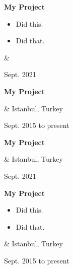 \documentclass[10pt, letterpaper]{article}
\newenvironment{highlights}{
        \begin{itemize}[
                topsep=0pt,
                parsep=0.10 cm,
                partopsep=0pt,
                itemsep=0pt,
                after=\vspace{-1\baselineskip},
                leftmargin=0.4 cm + 3pt
            ]
    }{
        \end{itemize}
    } %
\let\originalTabularx\tabularx
\let\originalEndTabularx\endtabularx
\renewenvironment{tabularx}{\bgroup\centering\originalTabularx}{\originalEndTabularx\par\egroup}
\begin{document}
        \vspace{0.2 cm}
        \begin{tabularx}{
            \textwidth-0.4 cm-0.13cm
        }{
            K{0.2 cm}
            R{4.1 cm}
        }
            \textbf{My Project}

            \vspace{0.10 cm}

            \begin{highlights}
                \item Did this.
                \item Did that.
            \end{highlights}
            &
            

            Sept. 2021
        \end{tabularx}


        \vspace{0.2 cm}
        \begin{tabularx}{
            \textwidth-0.4 cm-0.13cm
        }{
            K{0.2 cm}
            R{4.1 cm}
        }
            \textbf{My Project}

            \vspace{0.10 cm}

            &
            Istanbul, Turkey

            Sept. 2015 to present
        \end{tabularx}


        \vspace{0.2 cm}
        \begin{tabularx}{
            \textwidth-0.4 cm-0.13cm
        }{
            K{0.2 cm}
            R{4.1 cm}
        }
            \textbf{My Project}

            \vspace{0.10 cm}

            &
            Istanbul, Turkey

            Sept. 2021
        \end{tabularx}


        \vspace{0.2 cm}
        \begin{tabularx}{
            \textwidth-0.4 cm-0.13cm
        }{
            K{0.2 cm}
            R{4.1 cm}
        }
            \textbf{My Project}

            \vspace{0.10 cm}

            \begin{highlights}
                \item Did this.
                \item Did that.
            \end{highlights}
            &
            Istanbul, Turkey

            Sept. 2015 to present
        \end{tabularx}
\end{document}

